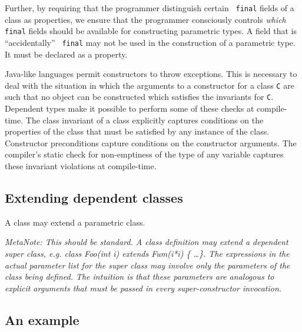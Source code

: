 \documentclass[nocopyrightspace,preprint,9pt]{sigplanconf}
\newcommand\java{{Java}}
\begin{document}
Further, by requiring that the programmer distinguish certain {\tt
final} fields of a class as properties, we ensure that the programmer
consciously controls {\em which} {\tt final} fields should be available for
constructing parametric types. A field that is ``accidentally'' {\tt
final} may not be used in the construction of a parametric type. It must be
declared as a property.

\java{}-like languages permit constructors to throw exceptions. This
is necessary to deal with the situation in which the arguments to a
constructor for a class {\tt C} are such that no object can be
constructed which satisfies the invariants for {\tt C}. Dependent
types make it possible to perform some of these checks at
compile-time. The class invariant of a class explicitly captures
conditions on the properties of the class that must be satisfied by
any instance of the class.  Constructor preconditions capture
conditions on the constructor arguments.
The compiler's static check for
non-emptiness of the type of any variable captures these invariant
violations at compile-time.




\subsection{Extending dependent classes}

A class may extend a parametric class.

{\em MetaNote: This should be standard. A class definition may extend
a dependent super class, e.g. class Foo(int i) extends Fum(i*i) \{
\ldots \}. The expressions in the actual parameter list for the super
class may involve only the parameters of the class being defined. The
intuition is that these parameters are analogous to explicit arguments
that must be passed in every super-constructor invocation.}

\subsection{An example}
\end{document}
